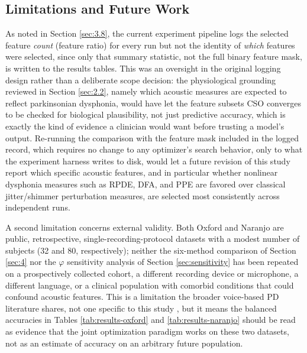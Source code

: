 \subsection{Limitations and Future Work} \label{sec:5.4}
As noted in Section \ref{sec:3.8}, the current experiment pipeline logs the selected feature \emph{count} (feature ratio) for every run but not the identity of \emph{which} features were selected, since only that summary statistic, not the full binary feature mask, is written to the results tables. This was an oversight in the original logging design rather than a deliberate scope decision: the physiological grounding reviewed in Section \ref{sec:2.2}, namely which acoustic measures are expected to reflect parkinsonian dysphonia, would have let the feature subsets CSO converges to be checked for biological plausibility, not just predictive accuracy, which is exactly the kind of evidence a clinician would want before trusting a model's output. Re-running the comparison with the feature mask included in the logged record, which requires no change to any optimizer's search behavior, only to what the experiment harness writes to disk, would let a future revision of this study report which specific acoustic features, and in particular whether nonlinear dysphonia measures such as RPDE, DFA, and PPE are favored over classical jitter/shimmer perturbation measures, are selected most consistently across independent runs.

A second limitation concerns external validity. Both Oxford and Naranjo are public, retrospective, single-recording-protocol datasets with a modest number of subjects (32 and 80, respectively); neither the six-method comparison of Section \ref{sec:4} nor the $\varphi$ sensitivity analysis of Section \ref{sec:sensitivity} has been repeated on a prospectively collected cohort, a different recording device or microphone, a different language, or a clinical population with comorbid conditions that could confound acoustic features. This is a limitation the broader voice-based PD literature shares, not one specific to this study \cite{SedighMalekroodi:2025}, but it means the balanced accuracies in Tables \ref{tab:results-oxford} and \ref{tab:results-naranjo} should be read as evidence that the joint optimization paradigm works on these two datasets, not as an estimate of accuracy on an arbitrary future population.

